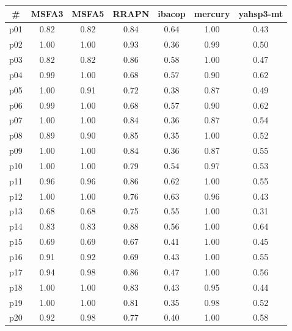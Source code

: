 \begin{tabular}{ccccccc}
\toprule
\textbf{\#} & \textbf{MSFA3} & \textbf{MSFA5} & \textbf{RRAPN} & \textbf{ibacop} & \textbf{mercury} & \textbf{yahsp3-mt}\\
\midrule
p01 & 0.82 & 0.82 & 0.84 & 0.64 & 1.00 & 0.43\\
p02 & 1.00 & 1.00 & 0.93 & 0.36 & 0.99 & 0.50\\
p03 & 0.82 & 0.82 & 0.86 & 0.58 & 1.00 & 0.47\\
p04 & 0.99 & 1.00 & 0.68 & 0.57 & 0.90 & 0.62\\
p05 & 1.00 & 0.91 & 0.72 & 0.38 & 0.87 & 0.49\\
p06 & 0.99 & 1.00 & 0.68 & 0.57 & 0.90 & 0.62\\
p07 & 1.00 & 1.00 & 0.84 & 0.36 & 0.87 & 0.54\\
p08 & 0.89 & 0.90 & 0.85 & 0.35 & 1.00 & 0.52\\
p09 & 1.00 & 1.00 & 0.84 & 0.36 & 0.87 & 0.55\\
p10 & 1.00 & 1.00 & 0.79 & 0.54 & 0.97 & 0.53\\
p11 & 0.96 & 0.96 & 0.86 & 0.62 & 1.00 & 0.55\\
p12 & 1.00 & 1.00 & 0.76 & 0.63 & 0.96 & 0.43\\
p13 & 0.68 & 0.68 & 0.75 & 0.55 & 1.00 & 0.31\\
p14 & 0.83 & 0.83 & 0.88 & 0.56 & 1.00 & 0.64\\
p15 & 0.69 & 0.69 & 0.67 & 0.41 & 1.00 & 0.45\\
p16 & 0.91 & 0.92 & 0.69 & 0.43 & 1.00 & 0.55\\
p17 & 0.94 & 0.98 & 0.86 & 0.47 & 1.00 & 0.56\\
p18 & 1.00 & 1.00 & 0.83 & 0.43 & 0.95 & 0.44\\
p19 & 1.00 & 1.00 & 0.81 & 0.35 & 0.98 & 0.52\\
p20 & 0.92 & 0.98 & 0.77 & 0.40 & 1.00 & 0.58\\
\bottomrule
\end{tabular}

